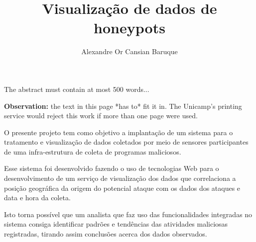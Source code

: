 \documentclass[%
        TwoSidePages,%
        Portuguese,%
        TablesPage,%
        FiguresPage,%
        ]
{ic-tese-v2}
\begin{document}
\title{ Visualização de dados de honeypots }




\author{Alexandre Or Cansian Baruque}






\beforepreface

\begin{theabstract}
	The abstract must contain at most 500 words...

	\textbf{Observation:} the text in this page *has to* fit it in. The Unicamp's printing service would reject this work
	if more than one page were used.
\end{theabstract}

\begin{oresumo}
O presente projeto tem como objetivo a implantação de um sistema para o tratamento e visualização de dados coletados por meio de sensores participantes de uma infra-estrutura de coleta de programas maliciosos.

Esse sistema foi desenvolvido fazendo o uso de tecnologias Web para o desenvolvimento de um serviço de visualização dos dados que correlaciona a posição geográfica da origem do potencial ataque com os dados dos ataques e data e hora da coleta.

Isto torna possível que um analista que faz uso das funcionalidades integradas no sistema consiga identificar padrões e tendências das atividades maliciosas registradas, tirando assim conclusões acerca dos dados observados.
\end{oresumo}
\end{document}
